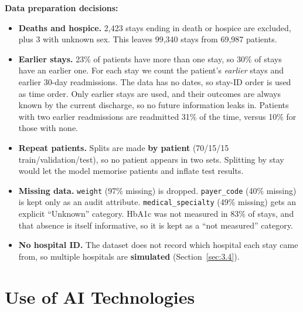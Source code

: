 \documentclass[10pt,a4paper]{article}
\newcommand{\lead}[1]{\needspace{4\baselineskip}\textbf{#1}}
\begin{document}
\lead{Data preparation decisions:}
\begin{itemize}
\item \textbf{Deaths and hospice.} 2,423 stays ending in death or hospice are excluded, plus 3 with unknown sex. This leaves 99,340 stays from 69,987 patients.
\item \textbf{Earlier stays.} 23\% of patients have more than one stay, so 30\% of stays have an earlier one. For each stay we count the patient's \emph{earlier} stays and earlier 30-day readmissions. The data has no dates, so stay-ID order is used as time order. Only earlier stays are used, and their outcomes are always known by the current discharge, so no future information leaks in. Patients with two earlier readmissions are readmitted 31\% of the time, versus 10\% for those with none.
\item \textbf{Repeat patients.} Splits are made \textbf{by patient} (70/15/15 train/validation/test), so no patient appears in two sets. Splitting by stay would let the model memorise patients and inflate test results.
\item \textbf{Missing data.} \texttt{weight} (97\% missing) is dropped. \texttt{payer\_code} (40\% missing) is kept only as an audit attribute. \texttt{medical\_specialty} (49\% missing) gets an explicit “Unknown” category. HbA1c was not measured in 83\% of stays, and that absence is itself informative, so it is kept as a “not measured” category.
\item \textbf{No hospital ID.} The dataset does not record which hospital each stay came from, so multiple hospitals are \textbf{simulated} (Section~\ref{sec:3.4}).
\end{itemize}

\section{Use of AI Technologies}\label{sec:3}
\end{document}
